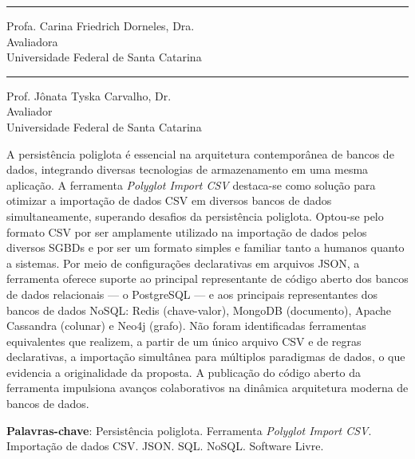 \documentclass[
  12pt,
  oneside,
  a4paper,
  chapter=TITLE,
  section=TITLE,
  english,
  brazil,
]{abntex2}
\newcommand\blankpage{%
  \null
  \thispagestyle{empty}%
  \addtocounter{page}{-1}%
\newpage}
\begin{document}
\begin{folhadeaprovacao}
\begin{center}
    \vspace{1.5\onelineskip}

    \rule{6cm}{1pt}

    Profa. Carina Friedrich Dorneles, Dra.\\
    Avaliadora\\
    Universidade Federal de Santa Catarina

    \vspace{1.5\onelineskip}

    \rule{6cm}{1pt}

    Prof. Jônata Tyska Carvalho, Dr.\\
    Avaliador\\
    Universidade Federal de Santa Catarina

  \end{center}
\end{folhadeaprovacao}

\afterpage{\blankpage}


\begin{resumo}
  A persistência poliglota é essencial na arquitetura contemporânea de bancos de dados,
  integrando diversas tecnologias de armazenamento em uma mesma aplicação. A ferramenta
  \textit{Polyglot Import CSV} destaca-se como solução para otimizar a importação de dados
  CSV em diversos bancos de dados simultaneamente, superando desafios da persistência
  poliglota. Optou-se pelo formato CSV por ser amplamente utilizado na importação de dados
  pelos diversos SGBDs e por ser um formato simples e familiar tanto a humanos quanto a
  sistemas. Por meio de configurações declarativas em arquivos JSON, a ferramenta oferece
  suporte ao principal representante de código aberto dos bancos de dados relacionais ---
  o PostgreSQL --- e aos principais representantes dos bancos de dados NoSQL: Redis
  (chave-valor), MongoDB (documento), Apache Cassandra (colunar) e Neo4j (grafo). Não
  foram identificadas ferramentas equivalentes que realizem, a partir de um único arquivo
  CSV e de regras declarativas, a importação simultânea para múltiplos paradigmas de dados,
  o que evidencia a originalidade da proposta. A publicação do código aberto da ferramenta
  impulsiona avanços colaborativos na dinâmica arquitetura moderna de bancos de dados.

  \vspace{\onelineskip}

  \noindent
  \textbf{Palavras-chave}: Persistência poliglota. Ferramenta \textit{Polyglot Import CSV}.
  Importação de dados CSV. JSON. SQL. NoSQL. Software Livre.
\end{resumo}
\end{document}
